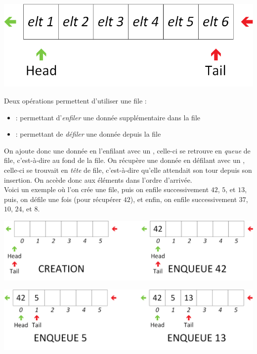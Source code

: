 \documentclass[11pt,a4paper]{article}
\begin{document}
\begin{center}
\includegraphics[scale=0.75]{img/files/Files_1_Structure_Generale.png}
\end{center}

\smallskip

Deux opérations permettent d'utiliser une file :
\begin{itemize}
\item {} : permettant d'\textit{enfiler} une donnée supplémentaire dans la file
\item {} : permettant de \textit{défiler} une donnée depuis la file
\end{itemize}
On ajoute donc une donnée en l'enfilant avec un , celle-ci se retrouve en \textit{queue} de file, c'est-à-dire au fond de la file.
On récupère une donnée en défilant avec un , celle-ci se trouvait en \textit{tête} de file, c'est-à-dire qu'elle attendait son tour depuis son insertion.
On accède donc aux éléments dans l'ordre d'arrivée.\\

Voici un exemple où l'on crée une file, puis on enfile successivement $ 42 $, $ 5 $, et $ 13 $, puis, on défile une fois (pour récupérer $ 42 $), et enfin, on enfile successivement $ 37 $, $ 10 $, $ 24 $, et $ 8 $.\\

\begin{center}
\includegraphics[scale=0.65]{img/files/Files_2_Structure_Generale_Usage_pack_1.png}
\end{center}

\begin{center}
\includegraphics[scale=0.65]{img/files/Files_2_Structure_Generale_Usage_pack_2.png}
\end{center}
\end{document}
